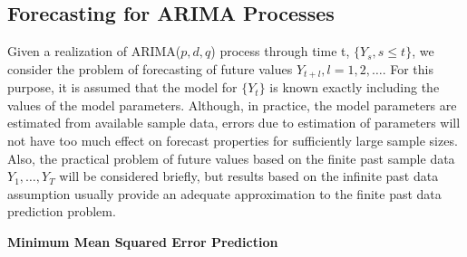 \subsection{Forecasting for ARIMA Processes}


Given a realization of ARIMA($p,d,q$) process through time t, $\{ Y_s, s \leq t \}$, we consider the problem of forecasting of future values $Y_{t+l}, l = 1,2, \ldots$. For this purpose, it is assumed that the model for $\{ Y_t \}$ is known exactly including the values of the model parameters. Although, in practice, the model parameters are estimated from available sample data, errors due to estimation of parameters will not have too much effect on forecast properties for sufficiently large sample sizes. Also, the practical problem of future values based on the finite past sample data $Y_1, \ldots, Y_T$ will be considered briefly, but results based on the infinite past data assumption usually provide an adequate approximation to the finite past data prediction problem. \twomedskip


\noindent \textbf{Minimum Mean Squared Error Prediction} \twomedskip


